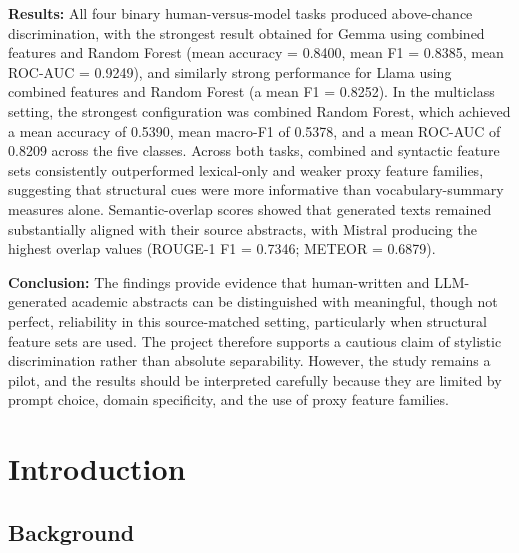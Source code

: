 \documentclass[12pt,a4paper]{article}
\begin{document}
\textbf{Results:} All four binary human-versus-model tasks produced above-chance discrimination, with the strongest result obtained for Gemma using combined features and Random Forest (mean accuracy = 0.8400, mean F1 = 0.8385, mean ROC-AUC = 0.9249), and similarly strong performance for Llama using combined features and Random Forest (a mean F1 = 0.8252). In the multiclass setting, the strongest configuration was combined Random Forest, which achieved a mean accuracy of 0.5390, mean macro-F1 of 0.5378, and a mean ROC-AUC of 0.8209 across the five classes. Across both tasks, combined and syntactic feature sets consistently outperformed lexical-only and weaker proxy feature families, suggesting that structural cues were more informative than vocabulary-summary measures alone. Semantic-overlap scores showed that generated texts remained substantially aligned with their source abstracts, with Mistral producing the highest overlap values (ROUGE-1 F1 = 0.7346; METEOR = 0.6879).

\textbf{Conclusion:} The findings provide evidence that human-written and LLM-generated academic abstracts can be distinguished with meaningful, though not perfect, reliability in this source-matched setting, particularly when structural feature sets are used. The project therefore supports a cautious claim of stylistic discrimination rather than absolute separability. However, the study remains a pilot, and the results should be interpreted carefully because they are limited by prompt choice, domain specificity, and the use of proxy feature families.

\clearpage
\tableofcontents

\newpage

\section{Introduction}

\subsection{Background}
\end{document}
